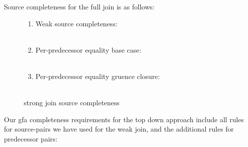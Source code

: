 Source completeness for the full join is as follows:
\begin{figure}[H]
\begin{enumerate}
	\item Weak source completeness:\\
	\\
	\item Per-predecessor equality base case:\\
	\\
	\item Per-predecessor equality gruence closure:\\
	\\
\end{enumerate}
\caption{strong join source completeness}
\label{strong_join_source_completeness}
\end{figure}




Our gfa completeness requirements for the top down approach include all rules for source-pairs we have used for the weak join, 
and the additional rules for predecessor pairs:

